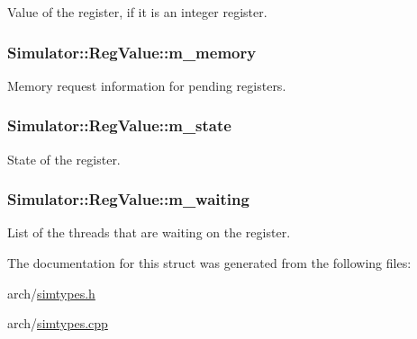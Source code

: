 Value of the register, if it is an integer register. 

\hypertarget{struct_simulator_1_1_reg_value_ab612245b6f5c7b10e781068e30f2550b}{
\subsubsection[{m\+\_\+memory}]{ Simulator\+::\+Reg\+Value\+::m\+\_\+memory}}\label{struct_simulator_1_1_reg_value_ab612245b6f5c7b10e781068e30f2550b}


Memory request information for pending registers. 

\hypertarget{struct_simulator_1_1_reg_value_af75bf158fb9f748049a782213309f18b}{
\subsubsection[{m\+\_\+state}]{ Simulator\+::\+Reg\+Value\+::m\+\_\+state}}\label{struct_simulator_1_1_reg_value_af75bf158fb9f748049a782213309f18b}


State of the register. 

\hypertarget{struct_simulator_1_1_reg_value_a91b3b5d8a1bba0c86d960188275fb190}{
\subsubsection[{m\+\_\+waiting}]{ Simulator\+::\+Reg\+Value\+::m\+\_\+waiting}}\label{struct_simulator_1_1_reg_value_a91b3b5d8a1bba0c86d960188275fb190}


List of the threads that are waiting on the register. 



The documentation for this struct was generated from the following files\+:\begin{DoxyCompactItemize}
\item 
arch/\hyperlink{simtypes_8h}{simtypes.\+h}\item 
arch/\hyperlink{simtypes_8cpp}{simtypes.\+cpp}\end{DoxyCompactItemize}
